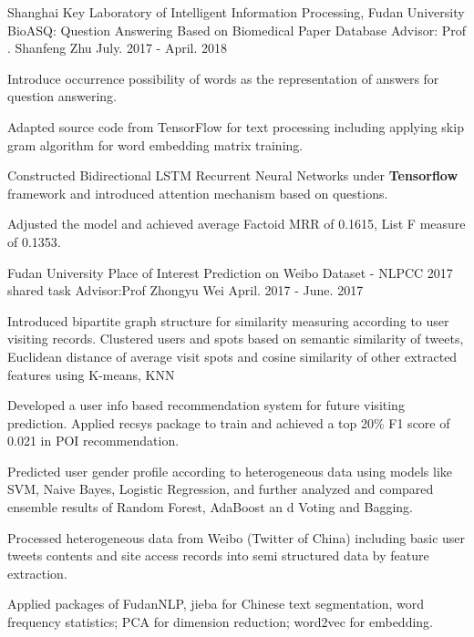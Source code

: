 \begin{cventries}
      \cventry
     {Shanghai Key Laboratory of Intelligent Information Processing, Fudan University} 
    {BioASQ: Question Answering Based on Biomedical Paper Database} %
    {Advisor: Prof . Shanfeng Zhu} %
    {July. 2017 - April. 2018} %
    {
      \begin{cvitems} %
	\item {Introduce occurrence possibility of words as the representation of answers for question answering.}
	\item {Adapted source code from TensorFlow for text processing including applying skip gram algorithm for word embedding matrix training.}
	\item {Constructed Bidirectional LSTM Recurrent Neural Networks under \textbf{Tensorflow} framework and introduced attention mechanism based on questions.}
	\item {Adjusted the model and achieved average Factoid MRR of 0.1615, List F measure of 0.1353.}
      \end{cvitems}
    }

    \cventry
     {Fudan University} 
    {Place of Interest Prediction on Weibo Dataset - NLPCC 2017 shared task} %
    {Advisor:Prof Zhongyu Wei} %
    {April. 2017 - June. 2017} %
    {
      \begin{cvitems} %
	\item {Introduced bipartite graph structure for similarity measuring according to user visiting records. Clustered users and spots based on semantic similarity of tweets, Euclidean distance of average visit spots and cosine similarity of other extracted features using K-means, KNN}
	\item {Developed a user info based recommendation system for future visiting prediction. Applied recsys package to train and achieved a top 20\% F1 score of 0.021 in POI recommendation.}
	\item {Predicted user gender profile according to heterogeneous data using models like SVM, Naive Bayes, Logistic Regression, and further analyzed and compared ensemble results of Random Forest, AdaBoost an d Voting and Bagging.}
	\item {Processed heterogeneous data from Weibo (Twitter of China) including basic user tweets contents and site access records into semi structured data by feature extraction.}
	\item {Applied packages of FudanNLP, jieba for Chinese text segmentation, word frequency statistics; PCA for dimension reduction; word2vec for embedding.}
      \end{cvitems}
    }
    

\end{cventries}

